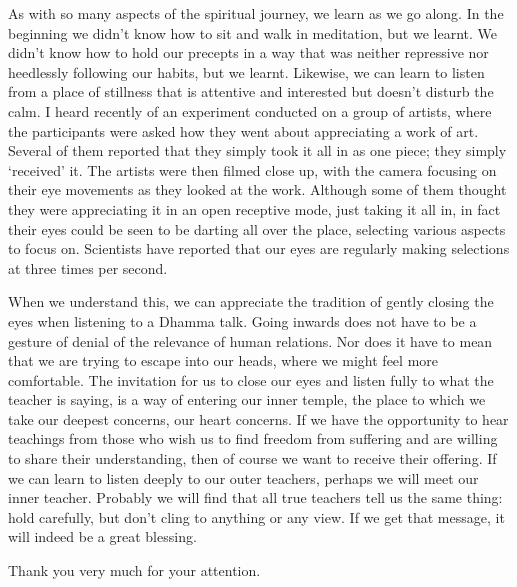 As with so many aspects of the spiritual journey, we learn as we go
along. In the beginning we didn’t know how to sit and walk in
meditation, but we learnt. We didn’t know how to hold our precepts in a
way that was neither repressive nor heedlessly following our habits, but
we learnt. Likewise, we can learn to listen from a place of stillness
that is attentive and interested but doesn’t disturb the calm. I heard
recently of an experiment conducted on a group of artists, where the
participants were asked how they went about appreciating a work of art.
Several of them reported that they simply took it all in as one piece;
they simply ‘received’ it. The artists were then filmed close up, with
the camera focusing on their eye movements as they looked at the work.
Although some of them thought they were appreciating it in an open
receptive mode, just taking it all in, in fact their eyes could be seen
to be darting all over the place, selecting various aspects to focus on.
Scientists have reported that our eyes are regularly making selections
at three times per second.

When we understand this, we can appreciate the tradition of gently
closing the eyes when listening to a Dhamma talk. Going inwards does not
have to be a gesture of denial of the relevance of human relations. Nor
does it have to mean that we are trying to escape into our heads, where
we might feel more comfortable. The invitation for us to close our eyes
and listen fully to what the teacher is saying, is a way of entering our
inner temple, the place to which we take our deepest concerns, our heart
concerns. If we have the opportunity to hear teachings from those who
wish us to find freedom from suffering and are willing to share their
understanding, then of course we want to receive their offering. If we
can learn to listen deeply to our outer teachers, perhaps we will meet
our inner teacher. Probably we will find that all true teachers tell us
the same thing: hold carefully, but don’t cling to anything or any view.
If we get that message, it will indeed be a great blessing.

Thank you very much for your attention.
